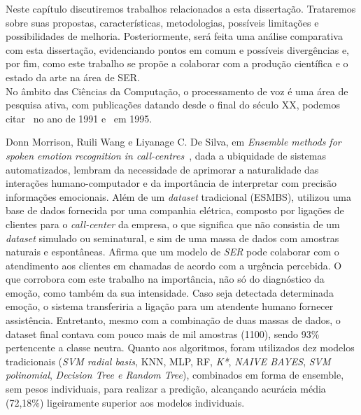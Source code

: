
Neste capítulo discutiremos trabalhos relacionados a esta dissertação. Trataremos sobre suas propostas, características, metodologias, possíveis limitações e possibilidades de melhoria. Posteriormente, será feita uma análise comparativa com esta dissertação, evidenciando pontos em comum e possíveis divergências e, por fim, como este trabalho se propõe a colaborar com a produção científica e o estado da arte na área de \acrshort{SER}.\\


No âmbito das Ciências da Computação, o processamento de voz é uma área de pesquisa ativa, com publicações datando desde o final do século XX, podemos citar~\cite{12.27} no ano de 1991 e~\cite{12.28} em 1995.


Donn Morrison, Ruili Wang e Liyanage C. De Silva, em \textit{Ensemble methods for spoken emotion recognition in call-centres}~\cite{32.32}, dada a ubiquidade de sistemas automatizados, lembram da necessidade de aprimorar a naturalidade das interações humano-computador e da importância de interpretar com precisão informações emocionais. Além de um \textit{dataset} tradicional (ESMBS), utilizou uma base de dados fornecida por uma companhia elétrica, composto por ligações de clientes para o \textit{call-center} da empresa, o que significa que não consistia de um \textit{dataset} simulado ou seminatural, e sim de uma massa de dados com amostras naturais e espontâneas. Afirma que um modelo de \textit{SER} pode colaborar com o atendimento aos clientes em chamadas de acordo com a urgência percebida. O que corrobora com este trabalho na importância, não só do diagnóstico da emoção, como também da sua intensidade. Caso seja detectada determinada emoção, o sistema transferiria a ligação para um atendente humano fornecer assistência. Entretanto, mesmo com a combinação de duas massas de dados, o dataset final contava com pouco mais de mil amostras (1100), sendo 93\% pertencente a classe neutra. Quanto aos algoritmos, foram utilizados dez modelos tradicionais (\textit{SVM radial basis}, \acrshort{KNN}, \acrshort{MLP}, \acrshort{RF}, \textit{K*}, \textit{NAIVE BAYES}, \textit{SVM polinomial}, \textit{Decision Tree e Random Tree}), combinados em forma de ensemble, sem pesos individuais, para realizar a predição, alcançando acurácia média (72,18\%) ligeiramente superior aos modelos individuais.

